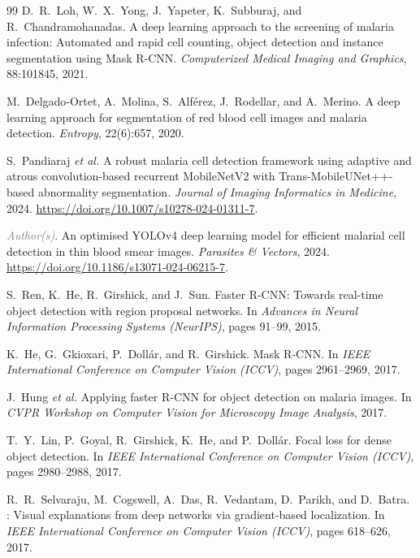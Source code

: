 \documentclass[10pt,twocolumn]{article}
\newcommand{\etal}{\textit{et al.}}
\newcommand{\placeholder}[1]{\textcolor{gray}{\textit{#1}}}
\begin{document}
\begin{thebibliography}{99}
D.~R.~Loh, W.~X.~Yong, J.~Yapeter, K.~Subburaj, and R.~Chandramohanadas.
\newblock A deep learning approach to the screening of malaria infection:
  Automated and rapid cell counting, object detection and instance
  segmentation using {Mask R-CNN}.
\newblock \textit{Computerized Medical Imaging and Graphics}, 88:101845, 2021.

M.~Delgado-Ortet, A.~Molina, S.~Alf\'{e}rez, J.~Rodellar, and A.~Merino.
\newblock A deep learning approach for segmentation of red blood cell images
  and malaria detection.
\newblock \textit{Entropy}, 22(6):657, 2020.

S.~Pandiaraj \etal
\newblock A robust malaria cell detection framework using adaptive and atrous
  convolution-based recurrent {MobileNetV2} with {Trans-MobileUNet++}-based
  abnormality segmentation.
\newblock \textit{Journal of Imaging Informatics in Medicine}, 2024.
\newblock \url{https://doi.org/10.1007/s10278-024-01311-7}.

\placeholder{Author(s)}.
\newblock An optimised {YOLOv4} deep learning model for efficient malarial
  cell detection in thin blood smear images.
\newblock \textit{Parasites \& Vectors}, 2024.
\newblock \url{https://doi.org/10.1186/s13071-024-06215-7}.

S.~Ren, K.~He, R.~Girshick, and J.~Sun.
\newblock Faster {R-CNN}: Towards real-time object detection with region
  proposal networks.
\newblock In \textit{Advances in Neural Information Processing Systems
  (NeurIPS)}, pages 91--99, 2015.

K.~He, G.~Gkioxari, P.~Doll{\'a}r, and R.~Girshick.
\newblock Mask {R-CNN}.
\newblock In \textit{IEEE International Conference on Computer Vision (ICCV)},
  pages 2961--2969, 2017.

J.~Hung \etal
\newblock Applying faster {R-CNN} for object detection on malaria images.
\newblock In \textit{CVPR Workshop on Computer Vision for Microscopy Image
  Analysis}, 2017.

T.~Y.~Lin, P.~Goyal, R.~Girshick, K.~He, and P.~Doll{\'a}r.
\newblock Focal loss for dense object detection.
\newblock In \textit{IEEE International Conference on Computer Vision (ICCV)},
  pages 2980--2988, 2017.

R.~R.~Selvaraju, M.~Cogswell, A.~Das, R.~Vedantam, D.~Parikh, and
  D.~Batra.
: Visual explanations from deep networks via
  gradient-based localization.
\newblock In \textit{IEEE International Conference on Computer Vision (ICCV)},
  pages 618--626, 2017.


\end{thebibliography}
\end{document}
